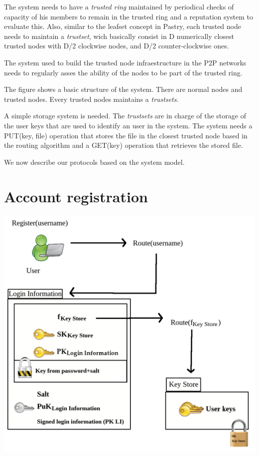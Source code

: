 The system needs to have a \textit{trusted ring} maintained by periodical
checks of capacity of his members to remain in the trusted ring and a
reputation system to evaluate this. Also, similar to the
leafset concept in Pastry, each trusted node needs to maintain a
\textit{trustset}, wich basically consist in D numerically closest trusted
nodes with D/2 clockwise nodes, and D/2 counter-clockwise ones.

The system used to build the trusted node infraestructure in the P2P networks
needs to regularly asses the ability of the nodes to be part of the trusted
ring.

The figure shows a basic structure of the system. There are normal nodes and
trusted nodes. Every trusted nodes maintains a \textit{trustsets}.

A simple storage system is needed.
The \textit{trustsets} are in charge of the storage of the user keys that are
used to identify an user in the system. The system needs a PUT(key,
file) operation that stores the file in the closest trusted node based in the
routing algorithm and a GET(key) operation that retrieves the stored file.


We now describe our protocols based on the system model. 

\section{Account registration}
\includegraphics[width=14cm]{../img/user_registration}\\

